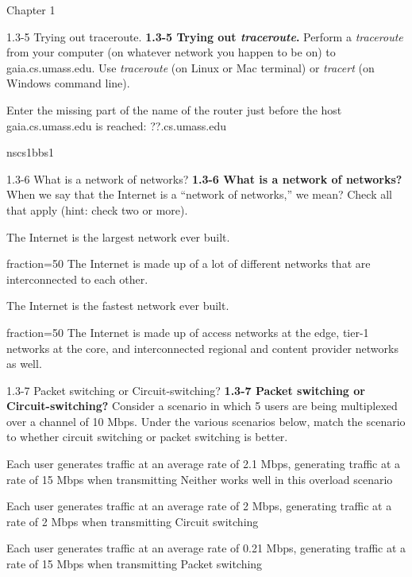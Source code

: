 \documentclass[a4paper]{article}
\begin{document}
\begin{quiz}{Chapter 1}
\begin{shortanswer}[points=1,shuffle=true]{1.3-5 Trying out traceroute.}
\textbf{1.3-5 Trying out \textit{traceroute}.} 
Perform a \textit{traceroute} from your computer (on whatever network you happen to be on) to gaia.cs.umass.edu. Use \textit{traceroute} (on Linux or Mac terminal) or \textit{tracert} (on Windows command line). 

Enter the missing part of the name of the router just before the host gaia.cs.umass.edu is reached: ??.cs.umass.edu
\item nscs1bbs1
\end{shortanswer}

\begin{multi}[points=1,shuffle=true,multiple]{1.3-6 What is a network of networks?}
\textbf{1.3-6 What is a network of networks?}  
When we say that the Internet is a ``network of networks,'' we mean? Check all that apply (hint: check two or more).
\item The Internet is the largest network ever built.
\item[fraction=50] The Internet is made up of a lot of different networks that are interconnected to each other.
\item The Internet is the fastest network ever built.
\item[fraction=50] The Internet is made up of access networks at the edge, tier-1 networks at the core, and interconnected regional and content provider networks as well.
\end{multi}

\begin{matching}[points=1,shuffle=true]{1.3-7 Packet switching or Circuit-switching?}
\textbf{1.3-7 Packet switching or Circuit-switching?}
Consider a scenario in which 5 users are being multiplexed over a channel of 10 Mbps.  
Under the various scenarios below, match the scenario to whether circuit switching or packet switching is better.

\item Each user generates traffic at an average rate of 2.1 Mbps, generating traffic at a rate of 15 Mbps when transmitting \answer Neither works well in this overload scenario
\item Each user generates traffic at an average rate of 2 Mbps, generating traffic at a rate of 2 Mbps when transmitting \answer Circuit switching
\item Each user generates traffic at an average rate of 0.21 Mbps, generating traffic at a rate of 15 Mbps when transmitting \answer Packet switching
\end{matching}


\end{quiz}
\end{document}
